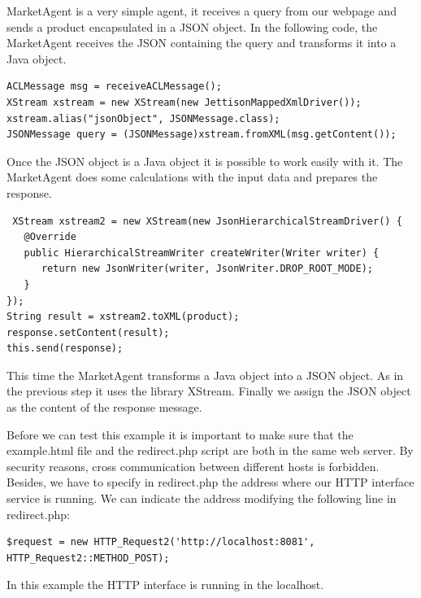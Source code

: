 MarketAgent is a very simple agent, it receives a query from our webpage and sends a product encapsulated in a JSON object. In the following code, the MarketAgent receives the JSON containing the query and transforms it into a Java object.
\begin{lstlisting}
ACLMessage msg = receiveACLMessage();
XStream xstream = new XStream(new JettisonMappedXmlDriver());
xstream.alias("jsonObject", JSONMessage.class);
JSONMessage query = (JSONMessage)xstream.fromXML(msg.getContent());
\end{lstlisting}

Once the JSON object is a Java object it is possible to work easily with it. The MarketAgent does some calculations with the input data and prepares the response. 

\begin{lstlisting}
 XStream xstream2 = new XStream(new JsonHierarchicalStreamDriver() {
   @Override
   public HierarchicalStreamWriter createWriter(Writer writer) {
      return new JsonWriter(writer, JsonWriter.DROP_ROOT_MODE);
   }
});
String result = xstream2.toXML(product);
response.setContent(result);
this.send(response);
\end{lstlisting}

This time the MarketAgent transforms a Java object into a JSON object. As in the previous step it uses the library XStream. Finally we assign the JSON object as the content of the response message.

Before we can test this example it is important to make sure that the example.html file and the redirect.php script are both in the same web server. By security reasons, cross communication between different hosts is forbidden. Besides, we have to specify in redirect.php the address where our HTTP interface service is running. We can indicate the address modifying the following line in redirect.php:

\begin{lstlisting}
$request = new HTTP_Request2('http://localhost:8081', HTTP_Request2::METHOD_POST);
\end{lstlisting}

In this example the HTTP interface is running in the localhost.







